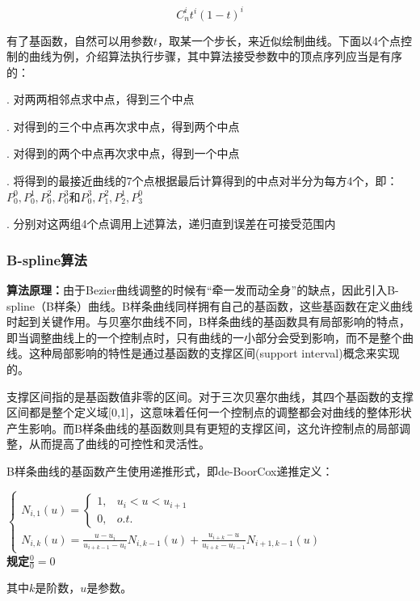 \documentclass[a4paper,UTF8]{article}
\theoremstyle{definition}
\begin{document}
$$C_n^it^i(1-t)^i$$

有了基函数，自然可以用参数$t$，取某一个步长，来近似绘制曲线。下面以4个点控制的曲线为例，介绍算法执行步骤，其中算法接受参数中的顶点序列应当是有序的：

. 对两两相邻点求中点，得到三个中点

. 对得到的三个中点再次求中点，得到两个中点

. 对得到的两个中点再次求中点，得到一个中点

. 将得到的最接近曲线的7个点根据最后计算得到的中点对半分为每方4个，即：$P_0^0,P_0^1,P_0^2,P_0^3$和$P_0^3,P_1^2,P_2^1,P_3^0$ 

. 分别对这两组4个点调用上述算法，递归直到误差在可接受范围内

\subsubsection{B-spline算法}

\textbf{算法原理：}由于Bezier曲线调整的时候有“牵一发而动全身”的缺点，因此引入B-spline（B样条）曲线。B样条曲线同样拥有自己的基函数，这些基函数在定义曲线时起到关键作用。与贝塞尔曲线不同，B样条曲线的基函数具有局部影响的特点，即当调整曲线上的一个控制点时，只有曲线的一小部分会受到影响，而不是整个曲线。这种局部影响的特性是通过基函数的支撑区间(support interval)概念来实现的。

支撑区间指的是基函数值非零的区间。对于三次贝塞尔曲线，其四个基函数的支撑区间都是整个定义域[0,1]，这意味着任何一个控制点的调整都会对曲线的整体形状产生影响。而B样条曲线的基函数则具有更短的支撑区间，这允许控制点的局部调整，从而提高了曲线的可控性和灵活性。

B样条曲线的基函数产生使用递推形式，即de-BoorCox递推定义：

\begin{center}
	$
	\begin{cases}  
		N_{i,1}(u)=\begin{cases}
			1,	& u_i < u < u_{i+1}	\\
			0, 	& o.t.
		\end{cases} \\
		N_{i,k}(u)=\frac{u-u_i}{u_{i+k-1}-u_i}N_{i,k-1}(u)+\frac{u_{i+k}-u}{u_{i+k}-u_{i-1}}N_{i+1,k-1}(u)
	\end{cases} 
	$	\\
	\textbf{规定$\frac{0}{0}=0$}
\end{center}

其中$k$是阶数，$u$是参数。
\end{document}
